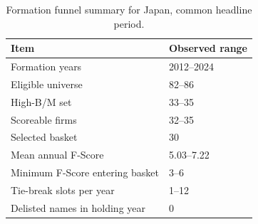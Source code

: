 \documentclass[11pt,a4paper]{report}
\numberwithin{figure}{chapter}
\numberwithin{table}{chapter}
\numberwithin{equation}{chapter}
\begin{document}
\begin{table}[H]
\centering
\scriptsize
\caption{Formation funnel summary for Japan, common headline period.}
\label{tab:japan_funnel}
\begin{tabularx}{0.72\textwidth}{p{} X}
\hline
\textbf{Item} & \textbf{Observed range} \\
\hline
Formation years & 2012--2024 \\
Eligible universe & 82--86 \\
High-B/M set & 33--35 \\
Scoreable firms & 32--35 \\
Selected basket & 30 \\
Mean annual F-Score & 5.03--7.22 \\
Minimum F-Score entering basket & 3--6 \\
Tie-break slots per year & 1--12 \\
Delisted names in holding year & 0 \\
\hline
\end{tabularx}
\end{table}
\end{document}
